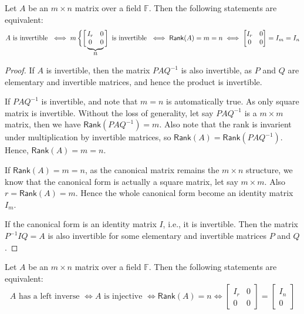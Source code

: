 \documentclass[
	11pt, %
	fleqn, %
	a4paper, %
]{LegrandOrangeBook}
\newcommand{\F}{\mathbb{F}} %
\newcommand{\rank}[1]{\mathsf{Rank}(#1)} %
\begin{document}
\def\matriximg{%
    \begin{matrix}
        I_r & 0 \\
        0 & 0 
    \end{matrix}
}

\begin{proposition}
    Let $A$ be an $m \times n$ matrix over a field $\F$. Then the following statements are equivalent:
    \[
        A \text{ is invertible } \iff m \left\{\left[\vphantom{\matriximg}\right.\right.\kern-2\nulldelimiterspace
        \underbrace{\matriximg}_{\text{\normalsize $n$}}\kern-\nulldelimiterspace\left.\vphantom{\matriximg}\right] \text{ is invertible } \iff \rank{A} = m = n \iff \begin{bmatrix}
            I_r & 0 \\
            0 & 0
        \end{bmatrix} = I_m = I_n
    \]
\end{proposition}

\begin{proof}
    If $A$ is invertible, then the matrix $PAQ^{-1}$ is also invertible, as $P$ and $Q$ are elementary and invertible matrices, and hence the product is invertible. 
    
    If $PAQ^{-1}$ is invertible, and note that $m = n$ is automatically true. As only square matrix is invertible. Without the loss of generality, let say $PAQ^{-1}$ is a $m \times m$ matrix, then we have $\rank{PAQ^{-1}} = m$. Also note that the rank is invarient under multiplication by invertible matrices, so $\rank{A} = \rank{PAQ^{-1}}$. Hence, $\rank{A} = m = n$.

    If $\rank{A} = m = n$, as the canonical matrix remains the $m \times n$ structure, we know that the canonical form is actually a square matrix, let say $m \times m$. Also $r = \rank{A} = m$. Hence the whole canonical form become an identity matrix $I_m$.

    If the canonical form is an identity matrix $I$, i.e., it is invertible. Then the matrix $P^{-1}IQ = A$ is also invertible for some elementary and invertible matrices $P$ and $Q$.
\end{proof}

\begin{proposition}
    Let $A$ be an $m \times n$ matrix over a field $\F$. Then the following statements are equivalent:
    \[
        A \text{ has a left inverse } \iff A \text{ is injective } \iff \rank{A} = n \iff \begin{bmatrix}
            I_r & 0 \\
            0 & 0
        \end{bmatrix} = \begin{bmatrix}
            I_n \\
            0
        \end{bmatrix}
    \]
\end{proposition}
\end{document}
